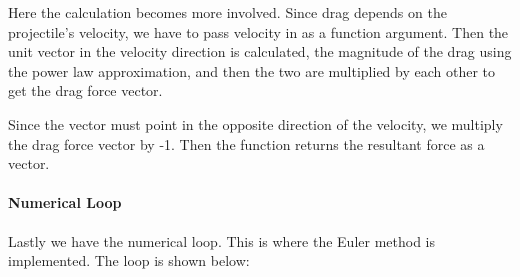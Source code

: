 \documentclass[11pt]{article}
\begin{document}
    Here the calculation becomes more involved. Since drag depends on the
projectile's velocity, we have to pass velocity in as a function
argument. Then the unit vector in the velocity direction is calculated,
the magnitude of the drag using the power law approximation, and then
the two are multiplied by each other to get the drag force vector.

Since the vector must point in the opposite direction of the velocity,
we multiply the drag force vector by -1. Then the function returns the
resultant force as a vector.

    \hypertarget{numerical-loop}{%
\paragraph{Numerical Loop}\label{numerical-loop}}

Lastly we have the numerical loop. This is where the Euler method is
implemented. The loop is shown below:
\end{document}
